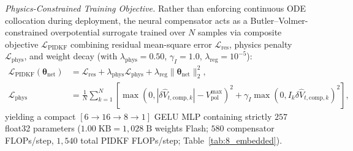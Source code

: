 \documentclass[11pt,a4paper]{article}
\begin{document}
\emph{Physics-Constrained Training Objective.} Rather than enforcing continuous ODE collocation during deployment, the neural compensator acts as a Butler--Volmer-constrained overpotential surrogate trained over $N$ samples via composite objective $\mathcal{L}_{\text{PIDKF}}$ combining residual mean-square error $\mathcal{L}_{\text{res}}$, physics penalty $\mathcal{L}_{\text{phys}}$, and weight decay (with $\lambda_{\text{phys}} = 0.50$, $\gamma_I = 1.0$, $\lambda_{\text{reg}} = 10^{-5}$):
\begin{align}
\mathcal{L}_{\text{PIDKF}}(\boldsymbol{\theta}_{\text{net}}) &= \mathcal{L}_{\text{res}} + \lambda_{\text{phys}} \mathcal{L}_{\text{phys}} + \lambda_{\text{reg}} \|\boldsymbol{\theta}_{\text{net}}\|_2^2, \label{eqn:loss_pidkf}\\
\mathcal{L}_{\text{phys}} &= \frac{1}{N}\sum_{k=1}^N \left[\max\left(0, |\delta \hat{V}_{t,\text{comp},k}| - V_{\text{pol}}^{\max}\right)^2 + \gamma_I \max\left(0, I_k \delta \hat{V}_{t,\text{comp},k}\right)^2\right], \label{eqn:loss_pidkf_phys}
\end{align}
yielding a compact $[6 \rightarrow 16 \rightarrow 8 \rightarrow 1]$ GELU MLP containing strictly $257$ float32 parameters ($1.00\;\mathrm{KB} = 1,028\;\mathrm{B}$ weights Flash; $580$ compensator FLOPs/step, $1,540$ total PIDKF FLOPs/step; Table~\ref{tab:8_embedded}).
\end{document}
